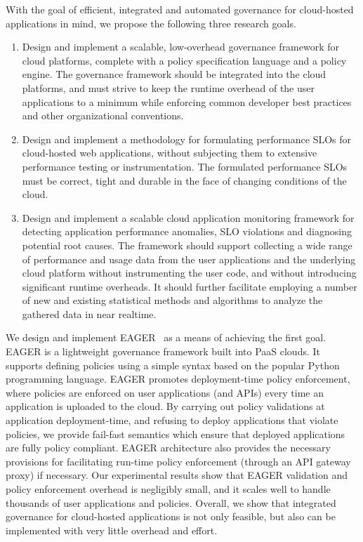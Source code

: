 With the goal of efficient, integrated and automated governance for cloud-hosted applications in mind,
we propose the following three research goals.
\begin{enumerate}
\item Design and implement a scalable, low-overhead governance framework for cloud platforms,
complete with a policy specification language and a policy engine. The governance framework should be
integrated into the cloud platforms, and must
strive to keep the runtime overhead of the user applications to a minimum while enforcing
common developer best practices and other organizational conventions.
\item Design and implement a methodology for formulating performance SLOs for cloud-hosted 
 web applications, without
 subjecting them to extensive performance testing or instrumentation. The formulated
 performance SLOs must be correct, tight and durable in the face of changing
 conditions of the cloud.
 \item Design and implement a scalable cloud application monitoring framework for detecting
application performance anomalies, SLO violations and diagnosing potential root causes. 
The framework should support collecting
 a wide range of performance and usage data from the user applications and the underlying cloud platform
 without instrumenting the user code, and without introducing significant runtime overheads.
 It should further facilitate employing a number of new and existing statistical methods
 and algorithms to analyze the gathered data in near realtime.
\end{enumerate}

We design and implement EAGER~\cite{6903538, eager-fop15} as a means of 
achieving the first goal. EAGER is a lightweight
governance framework built into PaaS clouds. It supports defining policies using a simple syntax
based on the popular Python programming language. EAGER promotes deployment-time
policy enforcement, where policies are enforced on user applications (and APIs) every time
an application is uploaded to the cloud. By carrying out policy validations at
application deployment-time, and refusing to deploy applications that violate policies,
 we provide fail-fast semantics which ensure that deployed applications are fully policy compliant. 
EAGER architecture also provides the necessary provisions for facilitating run-time policy
enforcement (through an API gateway proxy) if necessary. Our experimental results show
that EAGER validation and policy enforcement overhead is negligibly small, and it scales well to
handle thousands of user applications and policies. Overall, we show that integrated governance
for cloud-hosted applications is not only feasible, but also can be implemented with very
little overhead and effort.

